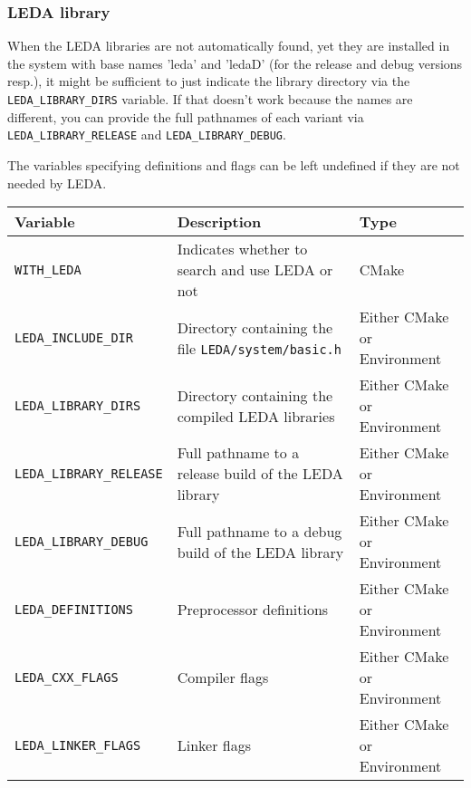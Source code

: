 \subsubsection{LEDA library}

When the LEDA libraries are not automatically found, yet they are installed in the system
with base names 'leda' and 'ledaD' (for the release and debug versions resp.), it might 
be sufficient to just indicate the library directory via the \texttt{LEDA\_LIBRARY\_DIRS} variable.
If that doesn't work because the names are different, you can provide the full pathnames of each variant
via \texttt{LEDA\_LIBRARY\_RELEASE} and \texttt{LEDA\_LIBRARY\_DEBUG}.

The variables specifying definitions and flags can be left undefined if they are not needed by LEDA.

\renewcommand{\arraystretch}{1.3}
\gdef\lcTabularBorder{2}
\begin{tabular}{|l|l|l|} \hline
  \textbf{Variable}               & \textbf{Description}                                       & \textbf{Type}\\\hline\hline
  \texttt{WITH\_LEDA}             & Indicates whether to search and use LEDA or not            & CMake\\\hline
  \texttt{LEDA\_INCLUDE\_DIR}     & Directory containing the file \texttt{LEDA/system/basic.h} & Either CMake or Environment\\\hline
  \texttt{LEDA\_LIBRARY\_DIRS}    & Directory containing the compiled LEDA libraries           & Either CMake or Environment\\\hline
  \texttt{LEDA\_LIBRARY\_RELEASE} & Full pathname to a release build of the LEDA library       & Either CMake or Environment\\\hline
  \texttt{LEDA\_LIBRARY\_DEBUG}   & Full pathname to a debug build of the LEDA library         & Either CMake or Environment\\\hline
  \texttt{LEDA\_DEFINITIONS}      & Preprocessor definitions                                   & Either CMake or Environment\\\hline
  \texttt{LEDA\_CXX\_FLAGS}       & Compiler flags                                             & Either CMake or Environment\\\hline
  \texttt{LEDA\_LINKER\_FLAGS}    & Linker flags                                               & Either CMake or Environment\\\hline
\end{tabular}

